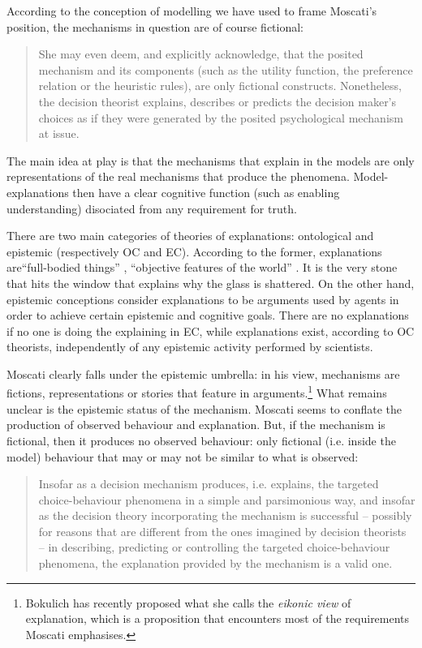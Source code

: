 \documentclass[a4paper,11pt]{article}
\theoremstyle{definition}
\begin{document}
According to the conception of modelling we have used to frame Moscati's position, the mechanisms in question are of course fictional:

\begin{quote}
     She may even deem, and explicitly acknowledge, that the posited mechanism and its components (such as the utility function, the preference relation or the heuristic rules), are only fictional constructs. Nonetheless, the decision theorist explains, describes or predicts the decision maker’s choices as if they were generated by the posited psychological mechanism at issue. \citep[p.~2]{Moscati2023}
\end{quote}

The main idea at play is that the mechanisms that explain in the models are only representations of the real mechanisms that produce the phenomena. Model-explanations then have a clear cognitive function (such as enabling understanding) disociated from any requirement for truth.

There are two main categories of theories of explanations: ontological and epistemic (respectively OC and EC). According to the former, explanations are``full-bodied things'' \citep[p.~40]{Craver2014}, ``objective features of the world'' \citep[p.~27]{Craver2007}. It is the very stone that hits the window that explains why the glass is shattered. On the other hand, epistemic conceptions consider explanations to be arguments used by agents in order to achieve certain epistemic and cognitive goals. There are no explanations if no one is doing the explaining in EC, while explanations exist, according to OC theorists, independently of any epistemic activity performed by scientists.

Moscati clearly falls under the epistemic umbrella: in his view, mechanisms are fictions, representations or stories that feature in arguments.\footnote{Bokulich \citep{Bokulich2018} has recently proposed what she calls the \textit{eikonic view} of explanation, which is a proposition that encounters most of the requirements Moscati emphasises.} What remains unclear is the epistemic status of the mechanism. Moscati seems to conflate the production of observed behaviour and explanation. But, if the mechanism is fictional, then it produces no observed behaviour: only fictional (i.e. inside the model) behaviour that may or may not be similar to what is observed:

\begin{quote}
    Insofar as a decision mechanism produces, i.e. explains, the targeted choice-behaviour phenomena in a simple and parsimonious way, and insofar as the decision theory incorporating the mechanism is successful – possibly for reasons that are different from the ones imagined by decision theorists – in describing, predicting or controlling the targeted choice-behaviour phenomena, the explanation provided by the mechanism is a valid one. \cite[p.~22]{Moscati2023}
\end{quote}
\end{document}
